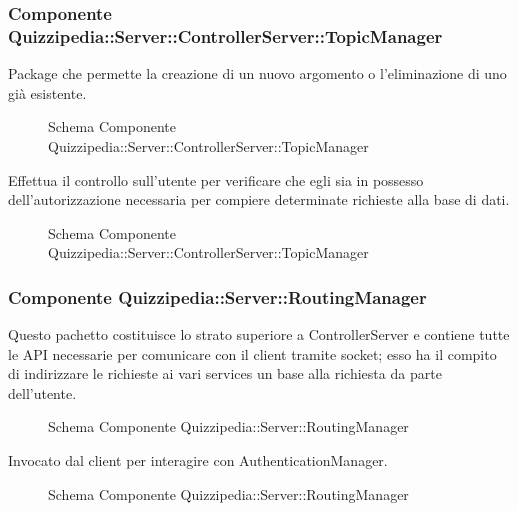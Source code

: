 \subsubsection{Componente Quizzipedia::Server::ControllerServer::TopicManager}
Package che permette la creazione di un nuovo argomento o l'eliminazione di uno già esistente.
\begin{figure}[H]
\centering
\noindent{}
\caption{Schema Componente Quizzipedia::Server::ControllerServer::TopicManager}
\end{figure}
Effettua il controllo sull'utente per verificare che egli sia in possesso dell'autorizzazione necessaria per compiere determinate richieste alla base di dati.
\begin{figure}[H]
\centering
\noindent{}
\caption{Schema Componente Quizzipedia::Server::ControllerServer::TopicManager}
\end{figure}
\subsubsection{Componente Quizzipedia::Server::RoutingManager}
Questo pachetto costituisce lo strato superiore a ControllerServer e contiene tutte le API necessarie per comunicare con il client tramite socket; esso ha il compito di indirizzare le richieste ai vari services un base alla richiesta da parte dell'utente.
\begin{figure}[H]
\centering
\noindent{}
\caption{Schema Componente Quizzipedia::Server::RoutingManager}
\end{figure}
Invocato dal client per interagire con AuthenticationManager.
\begin{figure}[H]
\centering
\noindent{}
\caption{Schema Componente Quizzipedia::Server::RoutingManager}
\end{figure}
